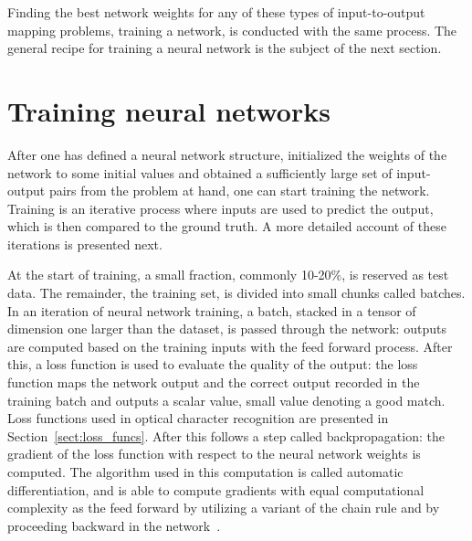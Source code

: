 \documentclass[english,twoside,openright]{UH_DS_MSc}
\begin{document}
Finding the best network weights for any of these types of input-to-output mapping problems, training 
a network, is conducted with the same process.
The general recipe for training a neural network is the subject of the next section.

\section{Training neural networks}
\label{sect:training}

After one has defined a neural network structure, initialized the weights of the network 
to some initial values and obtained a sufficiently large set of input-output pairs from the problem at hand,
one can start training the network. Training is an iterative process where inputs are used to 
predict the output, which is then compared to the ground truth. A more detailed account of these iterations
is presented next.

At the start of training, a small fraction, commonly 10-20\%, is reserved as test data. The remainder, 
the training set, is divided into small chunks called batches.
In an iteration of neural network training, a batch, stacked in a tensor of dimension one larger than the dataset, 
is passed through the network: outputs are computed based on the training inputs with the feed forward process.
After this, a loss function is used to evaluate the quality of the output: the loss function maps the network output and 
the correct output recorded in the training batch and outputs a scalar value, small value denoting a good 
match. Loss functions used in optical character recognition are presented in Section~\ref{sect:loss_funcs}.
After this follows a step called backpropagation: the gradient of the loss function with respect 
to the neural network weights is computed. The algorithm used in this computation is called automatic differentiation,
and is able to compute gradients with equal computational complexity as the feed forward by utilizing 
a variant of the chain rule and by proceeding backward in the network~\cite{princebook}.
\end{document}
